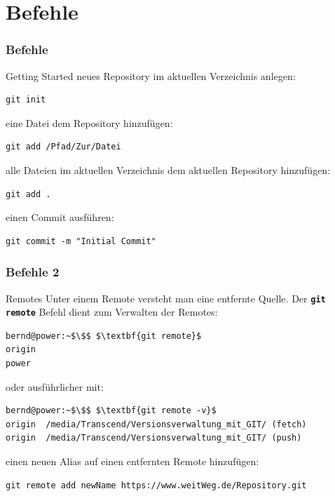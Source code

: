 \documentclass{beamer}
\begin{document}
\section{Befehle}
\begin{frame}[fragile]\frametitle{Befehle}
\begin{block} {Getting Started}
neues Repository im aktuellen Verzeichnis anlegen:
\begin{lstlisting}
git init
\end{lstlisting}
%

eine Datei dem Repository hinzufügen:
\begin{lstlisting}
git add /Pfad/Zur/Datei
\end{lstlisting}

alle Dateien im aktuellen Verzeichnis dem aktuellen Repository hinzufügen:
\begin{lstlisting}
git add .
\end{lstlisting}

einen Commit ausführen:
\begin{lstlisting}
git commit -m "Initial Commit"
\end{lstlisting}
\end{block}
\end{frame}

\begin{frame}[fragile]\frametitle{Befehle 2}
\begin{block} {Remotes}
Unter einem Remote versteht man eine entfernte Quelle. Der \textbf{\lstinline|git remote|} Befehl dient zum Verwalten der Remotes:
\begin{lstlisting}[mathescape=true]
bernd@power:~$\$$ $\textbf{git remote}$
origin
power
\end{lstlisting}

oder ausführlicher mit:
\begin{lstlisting}[mathescape=true]
bernd@power:~$\$$ $\textbf{git remote -v}$
origin  /media/Transcend/Versionsverwaltung_mit_GIT/ (fetch)
origin  /media/Transcend/Versionsverwaltung_mit_GIT/ (push)
\end{lstlisting}

einen neuen Alias auf einen entfernten Remote hinzufügen:
\begin{lstlisting}
git remote add newName https://www.weitWeg.de/Repository.git
\end{lstlisting}
\end{block}
\end{frame}
\end{document}
